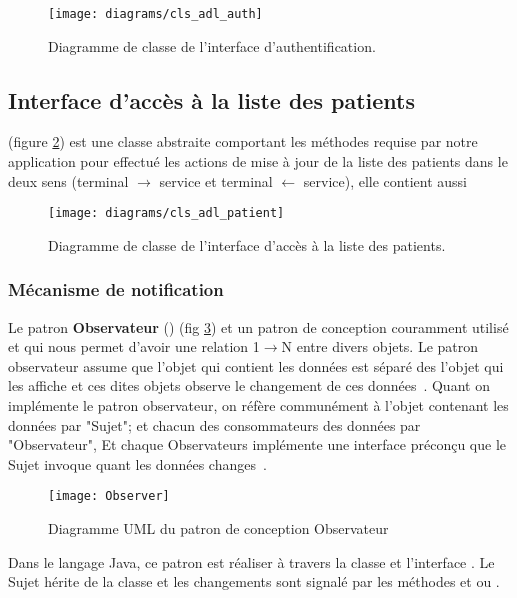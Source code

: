 \begin{figure}[H]
\center
\texttt{[image: diagrams/cls\_adl\_auth]}
\caption{Diagramme de classe de l'interface d'authentification.}
\label{fig:cls_adl_auth}
\end{figure}

\subsection{Interface d’accès à la liste des patients}

 (figure
\ref{fig:cls_adl_patient}) est une classe abstraite comportant les méthodes
requise par notre application pour effectué les actions de mise à jour de la liste des patients dans le deux sens (terminal $\rightarrow$ service et terminal $\leftarrow$ service), elle contient aussi 

\begin{figure}[H]
\center
\texttt{[image: diagrams/cls\_adl\_patient]}
\caption{Diagramme de classe de l'interface d’accès à la liste des patients.}
\label{fig:cls_adl_patient}
\end{figure}

\subsubsection{Mécanisme de notification}

Le patron \textbf{Observateur} () (fig
\ref{fig:observer}) et un patron de conception couramment utilisé et qui
nous permet d'avoir une relation 1$\rightarrow$N entre divers objets. Le
patron observateur assume que l'objet qui contient les données est
séparé des l’objet qui les affiche et ces dites objets observe le
changement de ces données~\cite{jdp_observer}. Quant on implémente le
patron observateur, on réfère communément à l'objet contenant les
données par "Sujet"; et chacun des consommateurs des données par
"Observateur", Et chaque Observateurs implémente une interface préconçu
que le Sujet invoque quant les données changes~\cite{jdp_observer}.

\begin{figure}[H]
\center
\texttt{[image: Observer]}
\caption{Diagramme UML du patron de conception Observateur~\cite{wiki:observer}}
\label{fig:observer}
\end{figure}

Dans le langage Java, ce patron est réaliser à travers la classe  et l'interface . Le Sujet hérite de la classe  et les changements sont signalé par les méthodes  et  ou .


